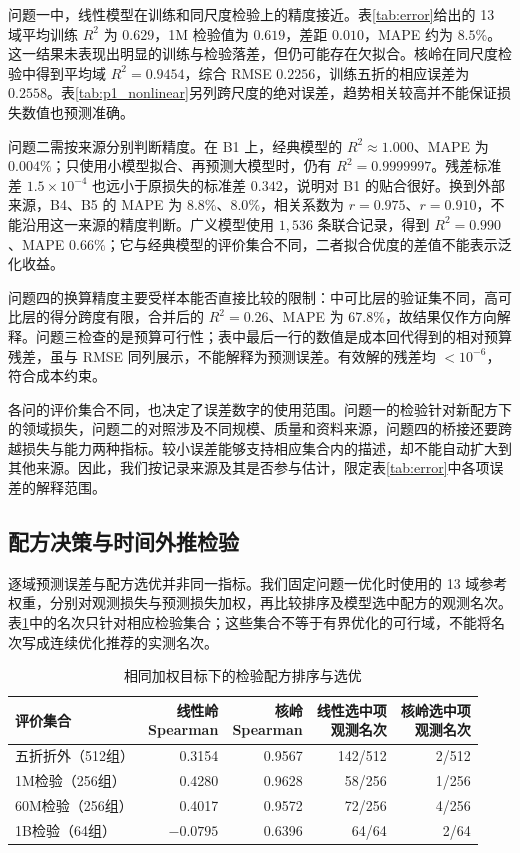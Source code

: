 问题一中，线性模型在训练和同尺度检验上的精度接近。表\ref{tab:error}给出的 13 域平均训练 $R^2$ 为 $0.629$，1M 检验值为 $0.619$，差距 $0.010$，MAPE 约为 $8.5\%$。这一结果未表现出明显的训练与检验落差，但仍可能存在欠拟合。核岭在同尺度检验中得到平均域 $R^2=0.9454$，综合 RMSE $0.2256$，训练五折的相应误差为 $0.2558$。表\ref{tab:p1_nonlinear}另列跨尺度的绝对误差，趋势相关较高并不能保证损失数值也预测准确。

问题二需按来源分别判断精度。在 B1 上，经典模型的 $R^2\approx1.000$、MAPE 为 $0.004\%$；只使用小模型拟合、再预测大模型时，仍有 $R^2=0.9999997$。残差标准差 $1.5\times10^{-4}$ 也远小于原损失的标准差 $0.342$，说明对 B1 的贴合很好。换到外部来源，B4、B5 的 MAPE 为 $8.8\%$、$8.0\%$，相关系数为 $r=0.975$、$r=0.910$，不能沿用这一来源的精度判断。广义模型使用 $1{,}536$ 条联合记录，得到 $R^2=0.990$、MAPE $0.66\%$；它与经典模型的评价集合不同，二者拟合优度的差值不能表示泛化收益。

问题四的换算精度主要受样本能否直接比较的限制：中可比层的验证集不同，高可比层的得分跨度有限，合并后的 $R^2=0.26$、MAPE 为 $67.8\%$，故结果仅作方向解释。问题三检查的是预算可行性；表中最后一行的数值是成本回代得到的相对预算残差，虽与 RMSE 同列展示，不能解释为预测误差。有效解的残差均 $<10^{-6}$，符合成本约束。

各问的评价集合不同，也决定了误差数字的使用范围。问题一的检验针对新配方下的领域损失，问题二的对照涉及不同规模、质量和资料来源，问题四的桥接还要跨越损失与能力两种指标。较小误差能够支持相应集合内的描述，却不能自动扩大到其他来源。因此，我们按记录来源及其是否参与估计，限定表\ref{tab:error}中各项误差的解释范围。

\subsection{配方决策与时间外推检验}
\label{sec:decision_validation}

逐域预测误差与配方选优并非同一指标。我们固定问题一优化时使用的 13 域参考权重，分别对观测损失与预测损失加权，再比较排序及模型选中配方的观测名次。表\ref{tab:weighted_decision}中的名次只针对相应检验集合；这些集合不等于有界优化的可行域，不能将名次写成连续优化推荐的实测名次。

\begin{table}[!htbp]
\centering
\caption{相同加权目标下的检验配方排序与选优}\label{tab:weighted_decision}
\begin{tabular}{@{}lrrrr@{}}
\toprule
评价集合 & \makecell{线性岭\\Spearman} & \makecell{核岭\\Spearman} & \makecell{线性选中项\\观测名次} & \makecell{核岭选中项\\观测名次}\\
\midrule
五折折外（512组） & 0.3154 & 0.9567 & 142/512 & 2/512\\
1M检验（256组） & 0.4280 & 0.9628 & 58/256 & 1/256\\
60M检验（256组） & 0.4017 & 0.9572 & 72/256 & 4/256\\
1B检验（64组） & $-0.0795$ & 0.6396 & 64/64 & 2/64\\
\bottomrule
\end{tabular}
\end{table}

